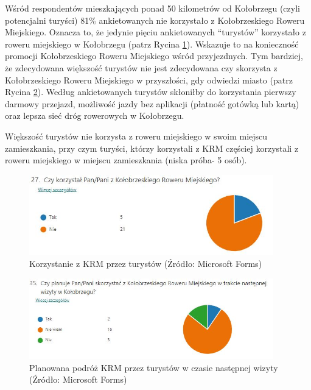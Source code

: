 \documentclass{amuthesis}
\begin{document}
Wśród respondentów mieszkających ponad 50 kilometrów od Kołobrzegu (czyli potencjalni turyści) 81\% ankietowanych nie korzystało z Kołobrzeskiego Roweru Miejskiego.
Oznacza to, że jedynie pięciu ankietowanych ``turystów'' korzystało z roweru miejskiego w Kołobrzegu (patrz Rycina \ref{fig:ankieta27}).
Wskazuje to na konieczność promocji Kołobrzeskiego Roweru Miejskiego wśród przyjezdnych.
Tym bardziej, że zdecydowana większość turystów nie jest zdecydowana czy skorzysta z Kołobrzeskiego Roweru Miejskiego w przyszłości, gdy odwiedzi miasto (patrz Rycina \ref{fig:ankieta35}).
Według ankietowanych turystów skłoniłby do korzystania pierwszy darmowy przejazd, możliwość jazdy bez aplikacji (płatność gotówką lub kartą) oraz lepsza sieć dróg rowerowych w Kołobrzegu.

Większość turystów nie korzysta z roweru miejskiego w swoim miejscu zamieszkania, przy czym turyści, którzy korzystali z KRM częściej korzystali z roweru miejskiego w miejscu zamieszkania (niska próba- 5 osób).

\begin{figure}[t]

{\centering \includegraphics[width=400px]{figures/ankieta/27} 

}

\caption{Korzystanie z KRM przez turystów (Źródło: Microsoft Forms)}\label{fig:ankieta27}
\end{figure}

\begin{figure}[t]

{\centering \includegraphics[width=400px]{figures/ankieta/35} 

}

\caption{Planowana podróż KRM przez turystów w czasie następnej wizyty (Źródło: Microsoft Forms)}\label{fig:ankieta35}
\end{figure}
\end{document}
